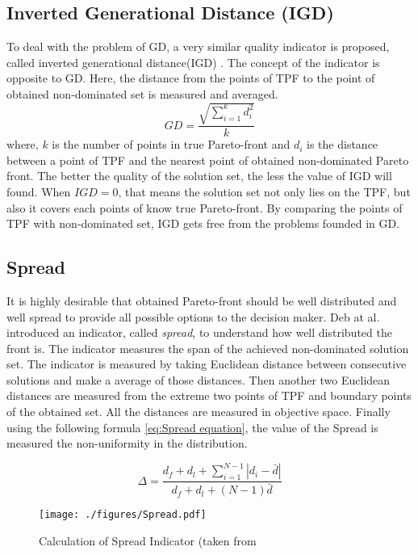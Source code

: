\documentclass{article}
\begin{document}
\subsection{Inverted Generational Distance (IGD)}
To deal with the problem of GD, a very similar quality indicator is proposed, called inverted generational distance(IGD) \cite{veldhuizen_multiobjective_1998}. 
The concept of the indicator is opposite to GD. 
Here, the distance from the points of TPF to the point of obtained non-dominated set is measured and averaged. 
\begin{equation}
GD=\frac{\sqrt{{\sum\limits_{i=1}^k{d_i^2} }}}{k}
\end{equation}
where, $k$ is the number of points in true Pareto-front and $d_i$ is the distance between a point of TPF and the nearest point of obtained non-dominated Pareto front. 
The better the quality of the solution set, the less the value of IGD will found. 
When $IGD=0$, that means the solution set not only lies on the TPF, but also it covers each points of know true Pareto-front.
By comparing the points of TPF with non-dominated set, IGD gets free from the problems founded in GD.

\subsection{Spread}
It is highly desirable that obtained Pareto-front should be well distributed and well spread to provide all possible options to the decision maker. 
Deb at al. \cite{deb_fast_2002} introduced an indicator, called \textit{spread}, to understand how well distributed the front is.   
The indicator measures the span of the achieved non-dominated solution set. 
The indicator is measured by taking Euclidean distance between consecutive solutions and make a average of those distances. 
Then another two Euclidean distances are measured from the extreme two points of TPF and boundary points of the obtained set. 
All the distances are measured in objective space. 
Finally using the following formula \ref{eq:Spread equation}, the value of the Spread is measured the non-uniformity in the distribution. 
 

\begin{equation}
\label{eq:Spread equation}
\Delta = \frac{d_f+d_l+\sum\limits_{i=1}^{N-1}|d_i-\bar{d}| }{d_f+d_l+(N-1) \bar{d}}
\end{equation}     
\begin{figure}
\centering

\texttt{[image: ./figures/Spread.pdf]}
\caption{Calculation of Spread Indicator (taken from \cite{deb_fast_2002}}
\label{Fig:Spread}
\end{figure}
\end{document}
